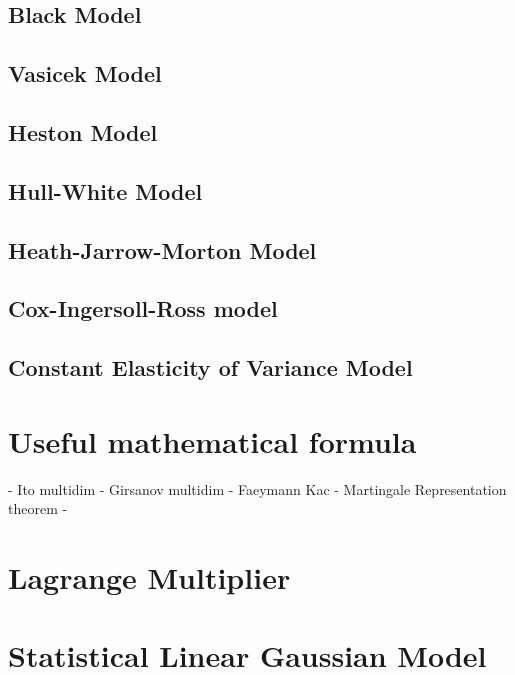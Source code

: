 \documentclass[a4paper,10pt]{article}
\begin{document}
\subsection{Black Model}
\subsection{Vasicek Model}
\subsection{Heston Model}
\subsection{Hull-White Model}
\subsection{Heath-Jarrow-Morton Model}
\subsection{Cox-Ingersoll-Ross model}
\subsection{Constant Elasticity of Variance Model}
\section{Useful mathematical formula}
- Ito multidim
- Girsanov multidim
- Faeymann Kac
- Martingale Representation theorem
- 
\section{Lagrange Multiplier}
\section{Statistical Linear Gaussian Model}


\end{document}
